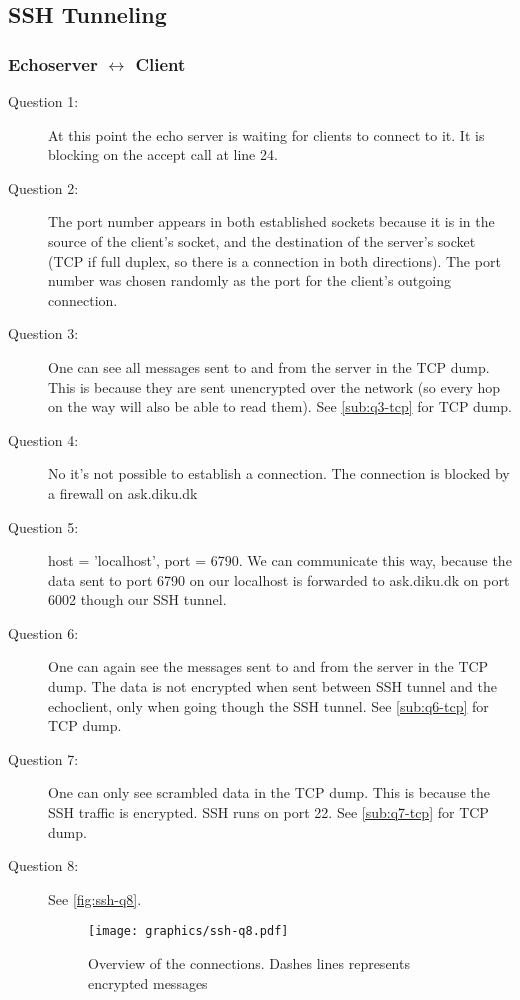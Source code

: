 \subsection{SSH Tunneling}
\subsubsection{{\sc Echoserver} $\leftrightarrow$ {\sc Client}}
\begin{description}
    \item[Question 1:] At this point the echo server is waiting for clients to connect to it. It is blocking on
        the accept call at line 24.
    \item[Question 2:] The port number appears in both established sockets because it is in the source of the client's
        socket, and the destination of the server's socket (TCP if full duplex, so there is a connection in both directions).
        The port number was chosen randomly as the port for the client's outgoing connection.
    \item[Question 3:] One can see all messages sent to and from the server in the TCP dump. This is because they are sent
        unencrypted over the network (so every hop on the way will also be able to read them). See \autoref{sub:q3-tcp} for TCP dump.
    \item[Question 4:] No it's not possible to establish a connection. The connection is blocked by a firewall on ask.diku.dk %
    \item[Question 5:]  host = 'localhost', port = 6790. We can communicate this way, because the data sent to port 6790 on our localhost is forwarded to ask.diku.dk on port 6002 though our SSH tunnel.
    \item[Question 6:] One can again see the messages sent to and from the server in the TCP dump. The data is not encrypted when sent between SSH tunnel and the echoclient, only when going though the SSH tunnel. See \autoref{sub:q6-tcp} for TCP dump.

    \item[Question 7:] One can only see scrambled data in the TCP dump. This is because the SSH traffic is encrypted. SSH runs on port 22. See \autoref{sub:q7-tcp} for TCP dump.

    \item[Question 8:]
    See \autoref{fig:ssh-q8}.
    \begin{center}
    \begin{figure}[H!]
        \texttt{[image: graphics/ssh-q8.pdf]}
        \caption{\label{fig:ssh-q8}Overview of the connections. Dashes lines represents encrypted messages}
    \end{figure}
    \end{center}
\end{description}
